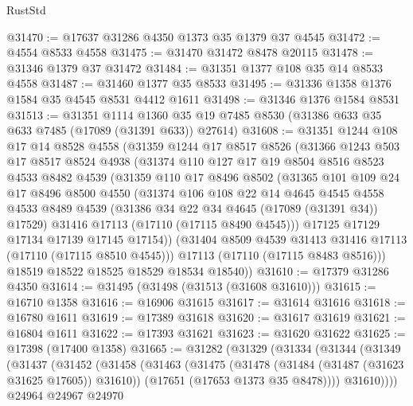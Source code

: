\begin{lexlean}{RustStd}
\begin{coremodule}
@31470 := @17637 @31286 @4350 @1373 @35 @1379 @37 @4545
@31472 := @4554 @8533 @4558
@31475 := @31470 @31472 @8478 @20115
@31478 := @31346 @1379 @37 @31472
@31484 := @31351 @1377 @108 @35 @14 @8533 @4558
@31487 := @31460 @1377 @35 @8533
@31495 := @31336 @1358 @1376 @1584 @35 @4545 @8531 @4412 @1611
@31498 := @31346 @1376 @1584 @8531
@31513 := @31351
    @1114
    @1360
    @35
    @19
    @7485
    @8530
    (@31386 @633 @35 @633 @7485 (@17089 (@31391 @633)) @27614)
@31608 := @31351
    @1244
    @108
    @17
    @14
    @8528
    @4558
    (@31359
      @1244
      @17
      @8517
      @8526
      (@31366
        @1243
        @503
        @17
        @8517
        @8524
        @4938
        (@31374
          @110
          @127
          @17
          @19
          @8504
          @8516
          @8523
          @4533
          @8482
          @4539
          (@31359
            @110
            @17
            @8496
            @8502
            (@31365
              @101
              @109
              @24
              @17
              @8496
              @8500
              @4550
              (@31374
                @106
                @108
                @22
                @14
                @4645
                @4545
                @4558
                @4533
                @8489
                @4539
                (@31386 @34 @22 @34 @4645 (@17089 (@31391 @34)) @17529)
                @31416
                @17113
                (@17110 (@17115 @8490 @4545)))
              @17125
              @17129
              @17134
              @17139
              @17145
              @17154))
          (@31404 @8509 @4539 @31413 @31416 @17113 (@17110 (@17115 @8510 @4545)))
          @17113
          (@17110 (@17115 @8483 @8516)))
        @18519
        @18522
        @18525
        @18529
        @18534
        @18540))
@31610 := @17379 @31286 @4350
@31614 := @31495 (@31498 (@31513 (@31608 @31610)))
@31615 := @16710 @1358
@31616 := @16906 @31615
@31617 := @31614 @31616
@31618 := @16780 @1611
@31619 := @17389 @31618
@31620 := @31617 @31619
@31621 := @16804 @1611
@31622 := @17393 @31621
@31623 := @31620 @31622
@31625 := @17398 (@17400 @1358)
@31665 := @31282
    (@31329
      (@31334
        (@31344
          (@31349
            (@31437
              (@31452
                (@31458
                  (@31463
                    (@31475
                      (@31478 (@31484 (@31487 (@31623 @31625 @17605)) @31610))
                      (@17651 (@17653 @1373 @35 @8478))))
                  @31610))))
          @24964
          @24967
          @24970

\end{coremodule}
\end{lexlean}
